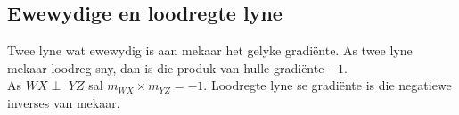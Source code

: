 \subsection*{Ewewydige en loodregte lyne}    
% 
Twee lyne wat ewewydig is aan mekaar het gelyke gradi\"ente. As twee lyne mekaar loodreg sny, dan is die produk van hulle gradi\"ente $-1$. \\

As $WX \perp $ $ YZ$ sal $m_{WX} \times m_{YZ} = -1$. Loodregte lyne se gradi\"ente is die negatiewe inverses van mekaar.

